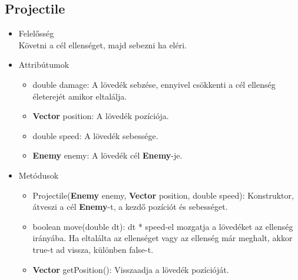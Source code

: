 \subsection{Projectile}
\begin{itemize}
\item Felelősség\\
Követni a cél ellenséget, majd sebezni ha eléri.
\item Attribútumok
	\begin{itemize}
		\item double damage: A lövedék sebzése, ennyivel csökkenti a cél ellenség életerejét amikor eltalálja.
		\item \textbf{Vector} position: A lövedék pozíciója.
		\item double speed: A lövedék sebessége.
		\item \textbf{Enemy} enemy: A lövedék cél \textbf{Enemy}-je.
	\end{itemize}
\item Metódusok
	\begin{itemize}
		\item Projectile(\textbf{Enemy} enemy, \textbf{Vector} position, double speed): Konstruktor, átveszi a cél \textbf{Enemy}-t, a kezdő pozíciót és sebességet.
		\item boolean move(double dt): dt * speed-el mozgatja a lövedéket az ellenség irányába. Ha eltalálta az ellenséget vagy az ellenség már meghalt, akkor true-t ad vissza, különben false-t.
		\item \textbf{Vector} getPosition(): Visszaadja a lövedék pozícióját.
	\end{itemize}
\end{itemize}


